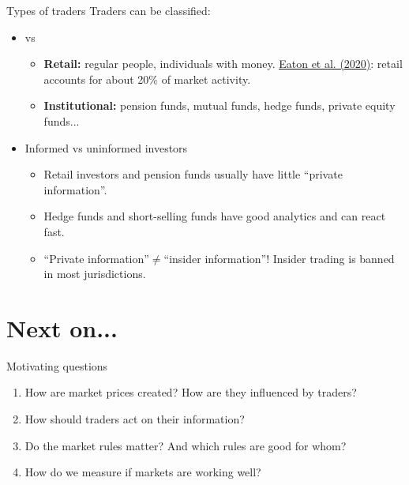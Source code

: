 \documentclass[english,10pt
,aspectratio=169
]{beamer}
\begin{document}
\begin{frame}{Types of traders}
Traders can be classified:
\begin{itemize}
	\item {} vs 
	\begin{itemize}
		\item \textbf{Retail:} regular people, individuals with money. \href{http://dx.doi.org/10.2139/ssrn.3776874}{\underline{Eaton et al. (2020)}}: retail accounts for about 20\% of market activity.
		\item \textbf{Institutional:} pension funds, mutual funds, hedge funds, private equity funds...
	\end{itemize}
	\item \alert{Informed} vs \alert{uninformed} investors
	\begin{itemize}
		\item Retail investors and pension funds usually have little ``private information''.
		\item Hedge funds and short-selling funds have good analytics and can react fast.
		\item ``Private information''$\neq$``insider information''! Insider trading is banned in most jurisdictions.
	\end{itemize}
\end{itemize}
\end{frame}






\section{Next on...}

\begin{frame}{Motivating questions}
	\begin{enumerate}
		\item How are market prices created? How are they influenced by traders?
		\item How should traders act on their information?
		\item Do the market rules matter? And which rules are good for whom?
		\item How do we measure if markets are working well?
	\end{enumerate}
\end{frame}
\end{document}
